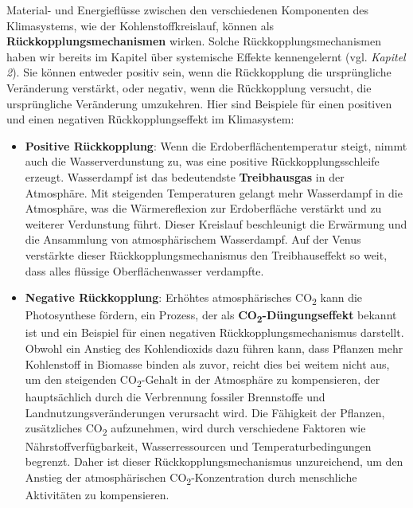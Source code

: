 \documentclass[
  nswissgerman,
  a4paper,
  openany]{book}
\begin{document}
Material- und Energieflüsse zwischen den verschiedenen Komponenten des
Klimasystems, wie der Kohlenstoffkreislauf, können als
\textbf{Rückkopplungsmechanismen} wirken. Solche
Rückkopplungsmechanismen haben wir bereits im Kapitel über systemische
Effekte kennengelernt (vgl. \emph{Kapitel 2}). Sie können entweder
positiv sein, wenn die Rückkopplung die ursprüngliche Veränderung
verstärkt, oder negativ, wenn die Rückkopplung versucht, die
ursprüngliche Veränderung umzukehren. Hier sind Beispiele für einen
positiven und einen negativen Rückkopplungseffekt im Klimasystem:

\begin{itemize}
\item
  \textbf{Positive Rückkopplung}: Wenn die Erdoberflächentemperatur
  steigt, nimmt auch die Wasserverdunstung zu, was eine positive
  Rückkopplungsschleife erzeugt. Wasserdampf ist das bedeutendste
  \textbf{Treibhausgas} in der Atmosphäre. Mit steigenden Temperaturen
  gelangt mehr Wasserdampf in die Atmosphäre, was die Wärmereflexion zur
  Erdoberfläche verstärkt und zu weiterer Verdunstung führt. Dieser
  Kreislauf beschleunigt die Erwärmung und die Ansammlung von
  atmosphärischem Wasserdampf. Auf der Venus verstärkte dieser
  Rückkopplungsmechanismus den Treibhauseffekt so weit, dass alles
  flüssige Oberflächenwasser verdampfte.
\item
  \textbf{Negative Rückkopplung}: Erhöhtes atmosphärisches
  CO\textsubscript{2} kann die Photosynthese fördern, ein Prozess, der
  als \textbf{CO\textsubscript{2}-Düngungseffekt} bekannt ist und ein
  Beispiel für einen negativen Rückkopplungsmechanismus darstellt.
  Obwohl ein Anstieg des Kohlendioxids dazu führen kann, dass Pflanzen
  mehr Kohlenstoff in Biomasse binden als zuvor, reicht dies bei weitem
  nicht aus, um den steigenden CO\textsubscript{2}-Gehalt in der
  Atmosphäre zu kompensieren, der hauptsächlich durch die Verbrennung
  fossiler Brennstoffe und Landnutzungsveränderungen verursacht wird.
  Die Fähigkeit der Pflanzen, zusätzliches CO\textsubscript{2}
  aufzunehmen, wird durch verschiedene Faktoren wie
  Nährstoffverfügbarkeit, Wasserressourcen und Temperaturbedingungen
  begrenzt. Daher ist dieser Rückkopplungsmechanismus unzureichend, um
  den Anstieg der atmosphärischen CO\textsubscript{2}-Konzentration
  durch menschliche Aktivitäten zu kompensieren.
\end{itemize}
\end{document}
